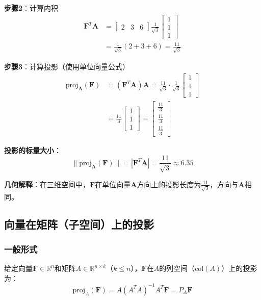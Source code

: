 \documentclass[12pt,a4paper]{article}
\begin{document}
\textbf{步骤2}：计算内积
\begin{align}
\bm{F}^T \bm{A} &= \begin{bmatrix} 2 & 3 & 6 \end{bmatrix} \frac{1}{\sqrt{3}}\begin{bmatrix} 1 \\ 1 \\ 1 \end{bmatrix} \\
&= \frac{1}{\sqrt{3}}(2 + 3 + 6) = \frac{11}{\sqrt{3}}
\end{align}

\textbf{步骤3}：计算投影（使用单位向量公式）
\begin{align}
\text{proj}_{\bm{A}}(\bm{F}) &= (\bm{F}^T \bm{A}) \bm{A} = \frac{11}{\sqrt{3}} \cdot \frac{1}{\sqrt{3}}\begin{bmatrix} 1 \\ 1 \\ 1 \end{bmatrix} \\
&= \frac{11}{3}\begin{bmatrix} 1 \\ 1 \\ 1 \end{bmatrix} = \begin{bmatrix} \frac{11}{3} \\ \frac{11}{3} \\ \frac{11}{3} \end{bmatrix}
\end{align}

\textbf{投影的标量大小}：
\begin{equation}
\|\text{proj}_{\bm{A}}(\bm{F})\| = |\bm{F}^T \bm{A}| = \frac{11}{\sqrt{3}} \approx 6.35
\end{equation}

\textbf{几何解释}：在三维空间中，$\bm{F}$在单位向量$\bm{A}$方向上的投影长度为$\frac{11}{\sqrt{3}}$，方向与$\bm{A}$相同。

\subsection{向量在矩阵（子空间）上的投影}

\subsubsection{一般形式}

给定向量$\bm{F} \in \mathbb{R}^n$和矩阵$A \in \mathbb{R}^{n \times k}$（$k \leq n$），$\bm{F}$在$A$的列空间（$\text{col}(A)$）上的投影为：
\begin{equation}
\text{proj}_{A}(\bm{F}) = A (A^T A)^{-1} A^T \bm{F} = P_A \bm{F}
\label{eq:subspace_projection}
\end{equation}
\end{document}
